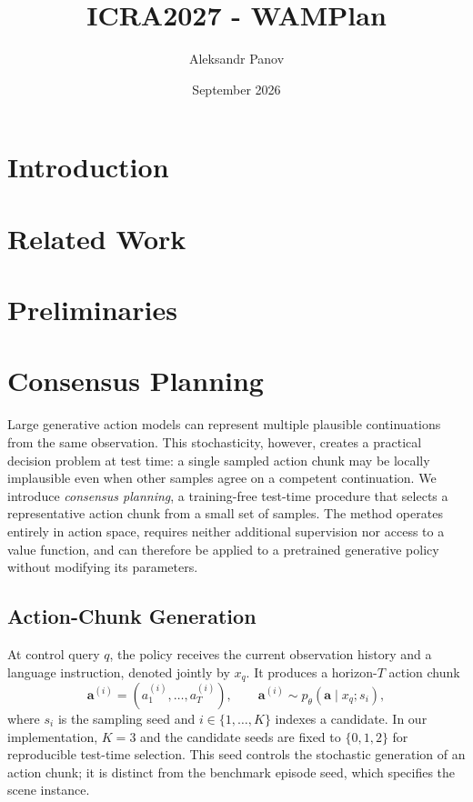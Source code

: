 \documentclass{article}
\title{ICRA2027 - WAMPlan}
\author{Aleksandr Panov}
\date{September 2026}
\begin{document}
\maketitle

\section{Introduction}

\section{Related Work}

\section{Preliminaries}

\section{Consensus Planning}
\label{sec:method}

Large generative action models can represent multiple plausible continuations
from the same observation. This stochasticity, however, creates a practical
decision problem at test time: a single sampled action chunk may be locally
implausible even when other samples agree on a competent continuation. We
introduce \emph{consensus planning}, a training-free test-time procedure that
selects a representative action chunk from a small set of samples. The method
operates entirely in action space, requires neither additional supervision nor
access to a value function, and can therefore be applied to a pretrained
generative policy without modifying its parameters.

\subsection{Action-Chunk Generation}

At control query $q$, the policy receives the current observation history and a
language instruction, denoted jointly by $x_q$. It produces a horizon-$T$
action chunk
\begin{equation}
    \mathbf{a}^{(i)} = \left(a^{(i)}_1,\ldots,a^{(i)}_T\right),
    \qquad \mathbf{a}^{(i)} \sim p_\theta(\mathbf{a}\mid x_q; s_i),
    \label{eq:candidates}
\end{equation}
where $s_i$ is the sampling seed and $i\in\{1,\ldots,K\}$ indexes a candidate.
In our implementation, $K=3$ and the candidate seeds are fixed to $\{0,1,2\}$
for reproducible test-time selection. This seed controls the stochastic
generation of an action chunk; it is distinct from the benchmark episode seed,
which specifies the scene instance.
\end{document}
